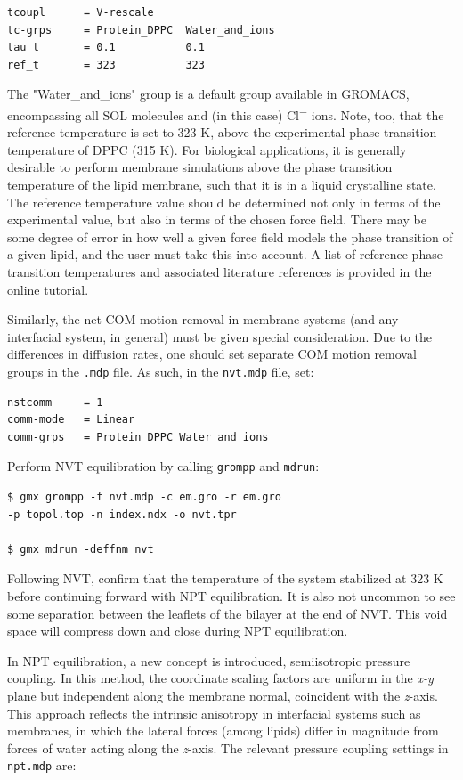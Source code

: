 \documentclass[9pt,tutorial]{livecoms}
\begin{document}
\begin{verbatim}
tcoupl      = V-rescale
tc-grps     = Protein_DPPC  Water_and_ions
tau_t       = 0.1           0.1
ref_t       = 323           323
\end{verbatim}

The "Water\_and\_ions" group is a default group available in GROMACS, encompassing all SOL molecules and (in this case) Cl\textsuperscript{$-$} ions. Note, too, that the reference temperature is set to 323 K, above the experimental phase transition temperature of DPPC (315 K). For biological applications, it is generally desirable to perform membrane simulations above the phase transition temperature of the lipid membrane, such that it is in a liquid crystalline state. The reference temperature value should be determined not only in terms of the experimental value, but also in terms of the chosen force field. There may be some degree of error in how well a given force field models the phase transition of a given lipid, and the user must take this into account. A list of reference phase transition temperatures and associated literature references is provided in the online tutorial.

Similarly, the net COM motion removal in membrane systems (and any interfacial system, in general) must be given special consideration. Due to the differences in diffusion rates, one should set separate COM motion removal groups in the \texttt{.mdp} file. As such, in the \texttt{nvt.mdp} file, set:

\begin{verbatim}
nstcomm     = 1
comm-mode   = Linear
comm-grps   = Protein_DPPC Water_and_ions
\end{verbatim}

Perform NVT equilibration by calling \texttt{grompp} and \texttt{mdrun}:

\begin{verbatim}
$ gmx grompp -f nvt.mdp -c em.gro -r em.gro 
-p topol.top -n index.ndx -o nvt.tpr

$ gmx mdrun -deffnm nvt
\end{verbatim}

Following NVT, confirm that the temperature of the system stabilized at 323 K before continuing forward with NPT equilibration. It is also not uncommon to see some separation between the leaflets of the bilayer at the end of NVT. This void space will compress down and close during NPT equilibration.

In NPT equilibration, a new concept is introduced, semiisotropic pressure coupling. In this method, the coordinate scaling factors are uniform in the {\em x-y} plane but independent along the membrane normal, coincident with the {\em z}-axis. This approach reflects the intrinsic anisotropy in interfacial systems such as membranes, in which the lateral forces (among lipids) differ in magnitude from forces of water acting along the {\em z}-axis. The relevant pressure coupling settings in \texttt{npt.mdp} are:
\end{document}
